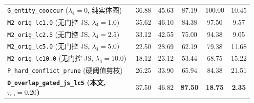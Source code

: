 \documentclass[11pt]{article}
\begin{document}
\begin{table}[t]
{\begin{tabular}{lccccc}
\texttt{G\_entity\_cooccur} ($\lambda_4=0$, 纯实体图) & 36.88 & 45.63 & 87.19 & 100.00 & 10.45 \\
\texttt{M2\_orig\_lc1.0} (无门控 JS, $\lambda_4=1.0$) & 35.62 & 46.10 & 84.38 & 97.50 & 9.57 \\
\texttt{M2\_orig\_lc2.5} (无门控 JS, $\lambda_4=2.5$) & 33.12 & 42.55 & 75.00 & 94.38 & 9.05 \\
\texttt{M2\_orig\_lc5.0} (无门控 JS, $\lambda_4=5.0$) & 22.50 & 28.69 & 62.19 & 79.38 & 11.68 \\
\texttt{M2\_orig\_lc10.0} (无门控 JS, $\lambda_4=10.0$) & 18.12 & 23.12 & 53.44 & 68.75 & 15.22 \\
\texttt{P\_hard\_conflict\_prune} (硬阈值剪枝) & 26.25 & 33.90 & 65.94 & 84.38 & 21.51 \\
\midrule
\textbf{\texttt{D\_overlap\_gated\_js\_lc5} (本文, $\tau_{\text{sh}}=0.20$)} & 37.50 & 46.82 & \textbf{87.50} & \textbf{18.75} & \textbf{2.35} \\
\bottomrule
\end{tabular}
}
\end{table}
\end{document}
